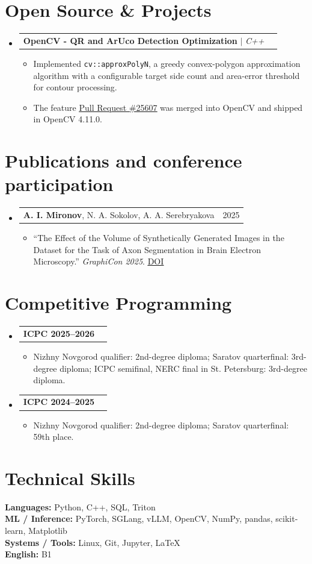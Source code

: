 \documentclass[letterpaper,10pt]{article}
\makeatletter
\newcommand{\resumeItem}[1]{\item\small{#1\vspace{-1pt}}}
\newcommand{\resumeProjectHeading}[2]{
  \item
  \begin{tabular*}{0.98\textwidth}{l@{\extracolsep{\fill}}r}
    \small #1 & \small #2 \\
  \end{tabular*}\vspace{-6pt}
}
\newcommand{\resumeSubHeadingListStart}{\begin{itemize}[leftmargin=0.14in,label={}]}
\newcommand{\resumeSubHeadingListEnd}{\end{itemize}}
\newcommand{\resumeItemListStart}{\begin{itemize}[leftmargin=0.22in,itemsep=1pt,topsep=2pt]}
\newcommand{\resumeItemListEnd}{\end{itemize}\vspace{-5pt}}
\makeatother
\begin{document}
\section{Open Source \& Projects}
\resumeSubHeadingListStart
  \resumeProjectHeading
    {\textbf{OpenCV - QR and ArUco Detection Optimization} $|$ \emph{C++}}{}
  \resumeItemListStart
    \resumeItem{Implemented \texttt{cv::approxPolyN}, a greedy convex-polygon approximation algorithm with a configurable target side count and area-error threshold for contour processing.}
    \resumeItem{The feature \href{https://github.com/opencv/opencv/pull/25607}{\underline{Pull Request \#25607}} was merged into OpenCV and shipped in OpenCV 4.11.0.}
  \resumeItemListEnd
\resumeSubHeadingListEnd


\section{Publications and conference participation}
\resumeSubHeadingListStart
  \resumeProjectHeading
    {\textbf{A. I. Mironov}, N. A. Sokolov, A. A. Serebryakova}{2025}
  \resumeItemListStart
    \resumeItem{``The Effect of the Volume of Synthetically Generated Images in the Dataset for the Task of Axon Segmentation in Brain Electron Microscopy.'' \textit{GraphiCon 2025}. \href{https://doi.org/10.25686/978-5-8158-2474-4-2025-828-834}{\underline{DOI}}}
  \resumeItemListEnd
\resumeSubHeadingListEnd

\section{Competitive Programming}
\resumeSubHeadingListStart
  \resumeProjectHeading{\textbf{ICPC 2025--2026}}{}
  \resumeItemListStart
    \resumeItem{Nizhny Novgorod qualifier: 2nd-degree diploma; Saratov quarterfinal: 3rd-degree diploma; ICPC semifinal, NERC final in St. Petersburg: 3rd-degree diploma.}
  \resumeItemListEnd
  \resumeProjectHeading{\textbf{ICPC 2024--2025}}{}
  \resumeItemListStart
    \resumeItem{Nizhny Novgorod qualifier: 2nd-degree diploma; Saratov quarterfinal: 59th place.}
  \resumeItemListEnd
\resumeSubHeadingListEnd

\section{Technical Skills}
\begin{itemize}[leftmargin=0.14in,label={}]
  \small{\item{
    \textbf{Languages:} Python, C++, SQL, Triton \\
    \textbf{ML / Inference:} PyTorch, SGLang, vLLM, OpenCV, NumPy, pandas, scikit-learn, Matplotlib \\
    \textbf{Systems / Tools:} Linux, Git, Jupyter, LaTeX \\
    \textbf{English:} B1
  }}
\end{itemize}
\end{document}
